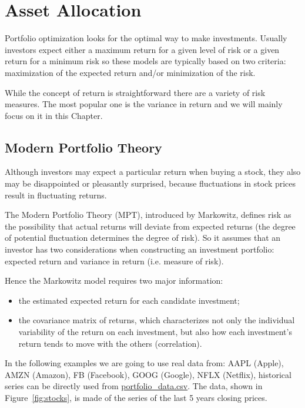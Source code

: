 \chapter{Asset Allocation}
\label{portfolio-optimization}

Portfolio optimization looks for the optimal way to make investments. Usually investors expect either a maximum return for a given level of risk or a given return for a minimum risk so these models are typically based on two criteria: maximization of the expected return and/or minimization of the risk.

While the concept of return is straightforward there are a variety of risk measures. The most popular one is the variance in return and we will mainly focus on it in this Chapter.

\section{Modern Portfolio Theory}
\label{the-markowitz-meanvariance-portfolio-model}

Although investors may expect a particular return when buying a stock, they also may be disappointed or pleasantly surprised, because fluctuations in stock prices result in fluctuating returns. 

The Modern Portfolio Theory (MPT), introduced by Markowitz, defines risk as the possibility that actual returns will deviate from expected returns (the degree of potential fluctuation determines the degree of risk).
So it assumes that an investor has two considerations when constructing an investment portfolio: expected return and variance in return (i.e. measure of risk). 

Hence the Markowitz model requires two major information:

\begin{itemize}
\tightlist
\item the estimated expected return for each candidate investment;
\item the covariance matrix of returns, which characterizes not only the individual variability of the return on each investment, but also how each investment's return tends to move with the others (correlation).
\end{itemize}

In the following examples we are going to use real data from:  AAPL (Apple), AMZN (Amazon), FB (Facebook), GOOG (Google), NFLX (Netflix), historical series can be directly used from \href{https://raw.githubusercontent.com/matteosan1/finance_course/develop/input_files/portfolio_data.csv}{portfolio\_data.csv}. The data, shown in Figure~\ref{fig:stocks}, is made of the series of the last 5 years closing prices. 

